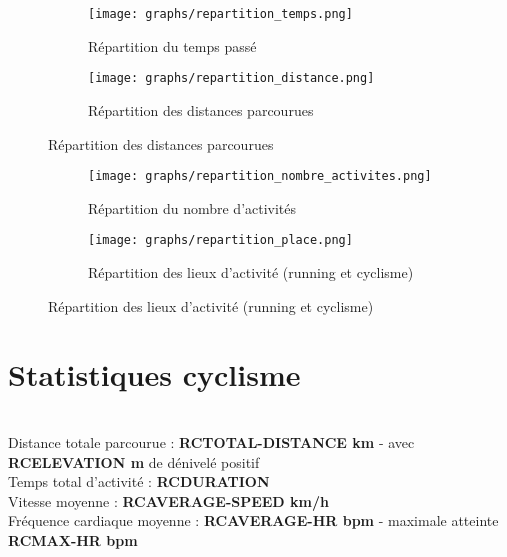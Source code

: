 \documentclass[a4paper,french,11pt]{report}
\begin{document}
\begin{figure}[!ht]
\begin{subfigure}{.49\linewidth}

\centering

\texttt{[image: graphs/repartition\_temps.png]}
\caption*{Répartition du temps passé}

\end{subfigure}\hfill
\begin{subfigure}{.49\linewidth}

\centering

\texttt{[image: graphs/repartition\_distance.png]}
\caption*{Répartition des distances parcourues}

\end{subfigure}

\end{figure}


\begin{figure}[!ht]
\begin{subfigure}{.49\linewidth}

\centering

\texttt{[image: graphs/repartition\_nombre\_activites.png]}
\caption*{Répartition du nombre d'activités}

\end{subfigure}\hfill
\begin{subfigure}{.49\linewidth}

\centering

\texttt{[image: graphs/repartition\_place.png]}
\caption*{Répartition des lieux d'activité (running et cyclisme)}

\end{subfigure}

\end{figure}

\newpage


\section*{Statistiques cyclisme}
\thispagestyle{empty}


\\
\textbullet Distance totale parcourue : \textbf{RCTOTAL-DISTANCE km} - avec \textbf{RCELEVATION m} de dénivelé positif\\
\textbullet Temps total d'activité : \textbf{RCDURATION} \\
\textbullet Vitesse moyenne : \textbf{RCAVERAGE-SPEED km/h} \\
\textbullet Fréquence cardiaque moyenne : \textbf{RCAVERAGE-HR bpm} - maximale atteinte \textbf{RCMAX-HR bpm}\\
\end{document}
